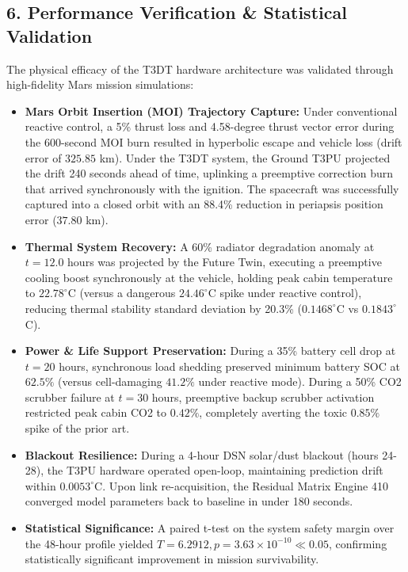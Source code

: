 \documentclass[12pt,a4paper]{article}
\begin{document}
\subsection*{6. Performance Verification \& Statistical Validation}
The physical efficacy of the T3DT hardware architecture was validated through high-fidelity Mars mission simulations:
\begin{itemize}
    \item \textbf{Mars Orbit Insertion (MOI) Trajectory Capture:} Under conventional reactive control, a 5\% thrust loss and 4.58-degree thrust vector error during the 600-second MOI burn resulted in hyperbolic escape and vehicle loss (drift error of $325.85$ km). Under the T3DT system, the Ground T3PU projected the drift 240 seconds ahead of time, uplinking a preemptive correction burn that arrived synchronously with the ignition. The spacecraft was successfully captured into a closed orbit with an 88.4\% reduction in periapsis position error ($37.80$ km).
    \item \textbf{Thermal System Recovery:} A 60\% radiator degradation anomaly at $t = 12.0$ hours was projected by the Future Twin, executing a preemptive cooling boost synchronously at the vehicle, holding peak cabin temperature to $22.78^\circ$C (versus a dangerous $24.46^\circ$C spike under reactive control), reducing thermal stability standard deviation by 20.3\% ($0.1468^\circ$C vs $0.1843^\circ$C).
    \item \textbf{Power \& Life Support Preservation:} During a 35\% battery cell drop at $t=20$ hours, synchronous load shedding preserved minimum battery SOC at $62.5\%$ (versus cell-damaging $41.2\%$ under reactive mode). During a 50\% CO2 scrubber failure at $t=30$ hours, preemptive backup scrubber activation restricted peak cabin CO2 to $0.42\%$, completely averting the toxic $0.85\%$ spike of the prior art.
    \item \textbf{Blackout Resilience:} During a 4-hour DSN solar/dust blackout (hours 24-28), the T3PU hardware operated open-loop, maintaining prediction drift within $0.0053^\circ$C. Upon link re-acquisition, the Residual Matrix Engine 410 converged model parameters back to baseline in under 180 seconds.
    \item \textbf{Statistical Significance:} A paired t-test on the system safety margin over the 48-hour profile yielded $T = 6.2912, p = 3.63 \times 10^{-10} \ll 0.05$, confirming statistically significant improvement in mission survivability.
\end{itemize}
\end{document}
